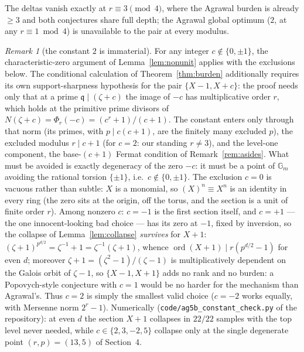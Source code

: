 \documentclass[11pt]{article}
\theoremstyle{remark}
\newtheorem{remark}[theorem]{Remark}
\DeclareMathOperator{\ord}{ord}
\begin{document}
The deltas vanish exactly at $r \equiv 3 \pmod 4$, where the Agrawal
burden is already $\ge 3$ and both conjectures share full depth; the
Agrawal global optimum ($2$, at any $r \equiv 1 \bmod 4$) is unavailable
to the pair at every modulus.

\begin{remark}[the constant $2$ is immaterial]\label{rem:constant}
For any integer $c \notin \{0, \pm 1\}$, the characteristic-zero argument of
Lemma~\ref{lem:nonunit} applies with the exclusions below. The conditional
calculation of Theorem~\ref{thm:burden} additionally requires its own
support-sharpness hypothesis for the pair $\{X-1,X+c\}$:
the proof needs only that at a prime $\mathfrak q \mid (\zeta + c)$ the
image of $-c$ has multiplicative order $r$, which holds at the primitive
prime divisors of $N(\zeta + c) = \Phi_r(-c) = (c^r + 1)/(c + 1)$. The
constant enters only through that norm (its primes, with
$p \mid c(c + 1)$, are the finitely many excluded $p$), the excluded
modulus $r \mid c + 1$ (for $c = 2$: our standing $r \ne 3$), and the
level-one component, the base-$(c{+}1)$ Fermat condition of
Remark~\ref{rem:asides}. What must be avoided is exactly degeneracy of
the zero $-c$: it must be a point of $\mathbb{G}_m$ avoiding the rational
torsion $\{\pm 1\}$, i.e.\ $c \notin \{0, \pm 1\}$. The exclusion
$c = 0$ is vacuous rather than subtle: $X$ is a monomial, so
$(X)^n \equiv X^n$ is an identity in every ring (the zero sits at the
origin, off the torus, and the section is a unit of finite order $r$).
Among nonzero $c$: $c = -1$ is the first section
itself, and $c = +1$ --- the one innocent-looking bad choice --- has its
zero at $-1$, fixed by inversion, so the collapse of
Lemma~\ref{lem:collapse} \emph{survives} for $X + 1$:
$(\zeta + 1)^{p^{d/2}} = \zeta^{-1} + 1 = \zeta^{-1}(\zeta + 1)$, whence
$\ord(X + 1) \mid r(p^{d/2} - 1)$ for even $d$; moreover $\zeta + 1 =
(\zeta^2 - 1)/(\zeta - 1)$ is multiplicatively dependent on the Galois
orbit of $\zeta - 1$, so $\{X - 1, X + 1\}$ adds no rank and no burden:
a Popovych-style conjecture with $c = 1$ would be no harder for the
mechanism than Agrawal's. Thus $c = 2$ is simply the smallest valid
choice ($c = -2$ works equally, with Mersenne norm $2^r - 1$).
Numerically (\texttt{code/ag5b\_constant\_check.py} of the repository):
at even $d$ the section $X + 1$ collapses in $22/22$ samples with the top
level never needed, while $c \in \{2, 3, -2, 5\}$ collapse only at the
single degenerate point $(r, p) = (13, 5)$ of Section~4.
\end{remark}
\end{document}
